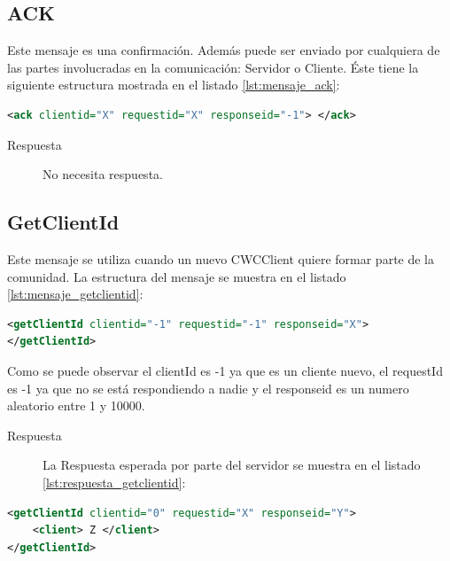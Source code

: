 
\subsection{ACK}

Este mensaje es una confirmación. Además puede ser enviado por cualquiera de las partes involucradas en la comunicación: Servidor o Cliente. Éste tiene la siguiente estructura mostrada en el listado \ref{lst:mensaje_ack}:

\begin{lstlisting}[language=XML,caption={Mensaje ACK},label={lst:mensaje_ack}]
<ack clientid="X" requestid="X" responseid="-1"> </ack>
\end{lstlisting}

\begin{description}
\item[Respuesta] No necesita respuesta.
\end{description}


\subsection{GetClientId}

Este mensaje se utiliza cuando un nuevo CWCClient quiere formar parte de la comunidad. La estructura del mensaje se muestra en el listado \ref{lst:mensaje_getclientid}:

\begin{lstlisting}[language=XML,caption={Mensaje GetClientId},label={lst:mensaje_getclientid}]
<getClientId clientid="-1" requestid="-1" responseid="X"> 
</getClientId>
\end{lstlisting}


Como se puede observar el clientId es -1 ya que es un cliente nuevo, el requestId es -1 ya que no se está respondiendo a nadie y el responseid es un numero aleatorio entre 1 y 10000. 

\begin{description}
\item[Respuesta] La Respuesta esperada por parte del servidor se muestra en el listado \ref{lst:respuesta_getclientid}:
\end{description}

 \begin{lstlisting}[language=XML,caption={Mensaje de Respuesta GetClientId},label={lst:respuesta_getclientid}]
<getClientId clientid="0" requestid="X" responseid="Y"> 
	<client> Z </client>
</getClientId>
\end{lstlisting}

